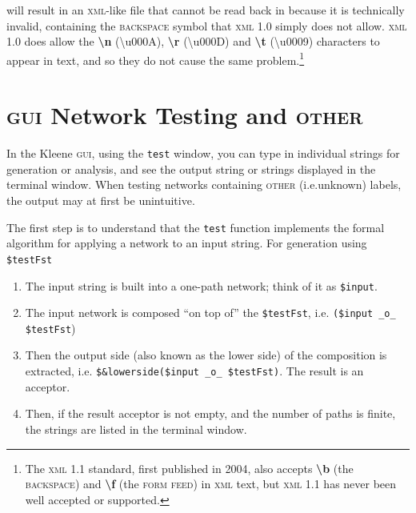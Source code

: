 \documentclass[letterpaper,12pt]{article}
\newcommand{\acro}{\textsc}
\begin{document}
\noindent
will result in an \acro{xml}-like file that cannot be read back in
because it is technically invalid, containing the \acro{backspace} symbol
that \acro{xml} 1.0 simply does not allow.  \acro{xml} 1.0 does allow the
\textbf{\textbackslash{}n} (\textbackslash{}u000A),
\textbf{\textbackslash{}r} (\textbackslash{}u000D) and
\textbf{\textbackslash{}t} (\textbackslash{}u0009) characters to appear
in text, and so they do not cause the same problem.\footnote{The
\acro{xml} 1.1 standard, first published in 2004, also accepts
\textbf{\textbackslash{}b} (the \acro{backspace}) and
\textbf{\textbackslash{}f} (the \acro{form feed}) in \acro{xml} text, but
\acro{xml} 1.1 has never been well accepted or supported.}

\newpage

\section{\acro{gui} Network Testing and \acro{other}}

\label{app:test}

\begin{samepage}
\begin{changebar}

In the Kleene \acro{gui}, using the \texttt{test} window, you can type in
individual strings for generation or analysis, and see the output string
or strings displayed in the terminal window.  When testing networks
containing \acro{other} (i.e.\@ unknown) labels, the output may at first
be unintuitive. 

The first step is to understand that the \texttt{test} function implements
the formal algorithm for applying a network to an input string.  For
generation using \verb!$testFst!

\end{changebar}
\end{samepage}

\begin{samepage}
\begin{changebar}

\begin{enumerate}
\item
The input string is built into a one-path network; think of it as \verb!$input!.
\item
The input network is composed ``on top of'' the \verb!$testFst!, i.e.\@ 
\verb!($input _o_ $testFst!)
\item
Then the output side (also known as the lower side) of the composition is extracted, i.e.\@
\verb!$&lowerside($input _o_ $testFst)!.  The result is an acceptor. 
\item
Then, if the result acceptor is not empty, and the number of paths is finite, the strings are listed in the
terminal window.
\end{enumerate}

\end{changebar}
\end{samepage}
\end{document}
